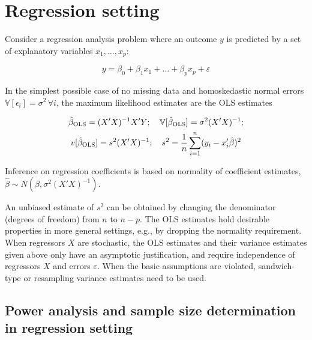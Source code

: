 \documentclass[11pt]{asaproc}
\newcommand{\Var}{\mathbb{V}}
\begin{document}
\section{Regression setting}

Consider a regression analysis problem where an outcome $y$ is predicted by a set of
explanatory variables $x_1, \ldots, x_p$:

\begin{equation}
    y = \beta_0 + \beta_1 x_1 + \ldots + \beta_p x_p + \varepsilon
    \label{eq:regress}
\end{equation}

In the simplest possible case of no missing data and homoskedastic normal errors $\Var[\epsilon_i]=\sigma^2 \, \forall i$,
the maximum likelihood estimates are the OLS estimates

\begin{gather}
    \hat\beta_{\rm OLS} = (X'X)^{-1} X'Y;
    \quad \Var[ \hat\beta_{\rm OLS} ] = \sigma^2 (X'X)^{-1};
    \notag \\
    v[ \hat\beta_{\rm OLS} ] = s^2 (X'X)^{-1};
    \quad s^2 = \frac1n \sum_{i=1}^n (y_i - x_i'\hat\beta)^2
    \label{eq:ols}
\end{gather}

Inference on regression coefficients is based on normality of coefficient estimates,
$\hat\beta \sim N(\beta,\sigma^2(X'X)^{-1})$.

An unbiased estimate of $s^2$ can be obtained by changing the denominator (degrees of freedom)
from $n$ to $n-p$. The OLS estimates hold desirable properties in more general settings,
e.g., by dropping the normality requirement. When regressors $X$ are stochastic, the OLS estimates
and their variance estimates given above only have an asymptotic justification, and require
independence of regressors $X$ and errors $\varepsilon$. When the basic assumptions are violated,
sandwich-type or resampling variance estimates need to be used.

\subsection{Power analysis and sample size determination in regression setting}
\label{subsec:reg:power}
\end{document}

